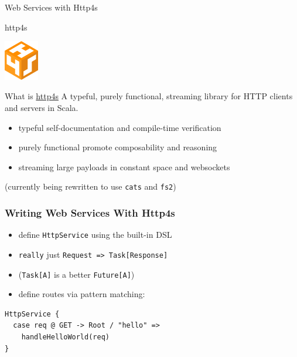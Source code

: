 \documentclass{beamer}
\begin{document}
\begin{frame}
  \begin{center}
    \Huge Web Services with Http4s
  \end{center}
\end{frame}

\begin{frame}{http4s}
  \begin{center}
    \includegraphics[width=15mm]{../pics/http4s.png}
  \end{center}

  \begin{block}{What is \hyperlink{http://http4s.org/}{http4s}}
    A typeful, purely functional, streaming library for HTTP
    clients and servers in Scala.
  \end{block}
  \begin{itemize}
  \item typeful \textemdash{} self-documentation and compile-time verification
  \item purely functional \textemdash{} promote composability and reasoning
  \item streaming \textemdash{} large payloads in constant space and
    websockets
  \end{itemize}
  \begin{center}
    \alert{(currently being rewritten to use \texttt{cats} and \texttt{fs2})}
  \end{center}

\end{frame}

\begin{frame}[fragile]
  \frametitle{Writing Web Services With Http4s}
  \begin{itemize}
  \item define \texttt{HttpService} using the built-in DSL
  \item \texttt{really} just \texttt{Request => Task[Response]}
  \item (\texttt{Task[A]} is a better \texttt{Future[A]})
  \item define routes via pattern matching:
  \end{itemize}
\begin{verbatim}
HttpService {
  case req @ GET -> Root / "hello" =>
    handleHelloWorld(req)
}
\end{verbatim}
\end{frame}
\end{document}
